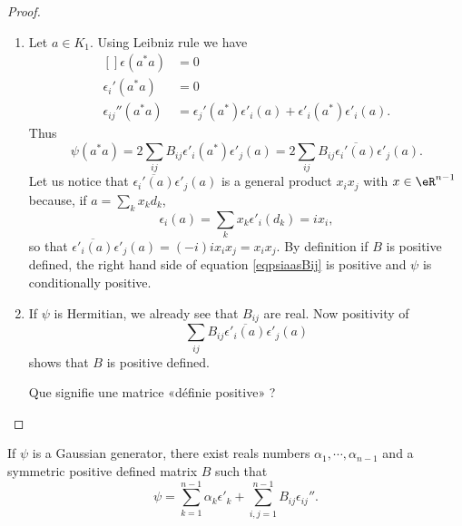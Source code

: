 \begin{proof}
\begin{enumerate}
		\item
		      Let $a\in K_1$. Using Leibniz rule we have
		      \begin{equation}
			      \begin{aligned}[]
				      \epsilon(a^*a)        & =0                                                              \\
				      \epsilon_i'(a^*a)     & =0                                                              \\
				      \epsilon_{ij}''(a^*a) & =\epsilon_j'(a^*)\epsilon'_i(a)+\epsilon'_i(a^*)\epsilon'_i(a).
			      \end{aligned}
		      \end{equation}
		      Thus
		      \begin{equation}        \label{eqpsiaasBij}
			      \psi(a^*a)=2\sum_{ij}B_{ij}\epsilon'_i(a^*)\epsilon'_j(a)=2\sum_{ij}B_{ij}\overline{ \epsilon_i'(a) }\epsilon'_j(a).
		      \end{equation}
		      Let us notice that $\overline{ \epsilon_i'(a) }\epsilon'_j(a)$ is a general product $x_ix_j$ with $x\in\eR^{n-1}$ because, if $a=\sum_kx_kd_k$,
		      \begin{equation}
			      \epsilon_i(a)=\sum_kx_k\epsilon'_i(d_k)=ix_i,
		      \end{equation}
		      so that $\overline{ \epsilon'_i(a) }\epsilon'_j(a)=(-i)ix_ix_j=x_ix_j$. By definition if $B$ is positive defined, the right hand side of equation \eqref{eqpsiaasBij} is positive and $\psi$ is conditionally positive.

		\item
		      If $\psi$ is Hermitian, we already see that $B_{ij}$ are real. Now positivity of
		      \begin{equation}
			      \sum_{ij}B_{ij}\overline{ \epsilon'_i(a) }\epsilon'_j(a)
		      \end{equation}
		      shows that $B$ is positive defined.

		      \begin{probleme}
			      Que signifie une matrice «définie positive» ?
		      \end{probleme}

	\end{enumerate}

\end{proof}

\begin{corollary}
	If $\psi$ is a Gaussian generator, there exist reals numbers $\alpha_1,\cdots,\alpha_{n-1}$ and a symmetric positive defined matrix $B$ such that
	\begin{equation}
		\psi=\sum_{k=1}^{n-1}\alpha_k\epsilon'_k+\sum_{i,j=1}^{n-1}B_{ij}\epsilon_{ij}''.
	\end{equation}
\end{corollary}

